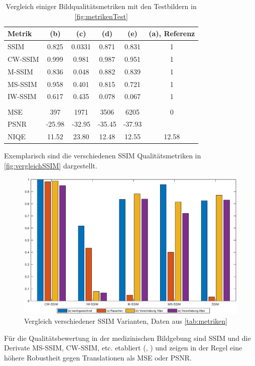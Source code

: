 \begin{table}[H]
	\centering
	\caption[Vergleich Bildqualitätsmetriken]{Vergleich einiger Bildqualitätsmetriken mit den Testbildern in \autoref{fig:metrikenTest}}
	\label{tab:metriken}
	\begin{tabular}{lSSSSS}
		\toprule
		\textbf{Metrik} & \textbf{(b)} & \textbf{(c)} & \textbf{(d)} & \textbf{(e)} & \textbf{(a), Referenz} \\
		\midrule
		SSIM    & 0.825 & 0.0331 & 0.871 & 0.831 & 1 \\
		CW-SSIM & 0.999 & 0.981  & 0.987 & 0.951 & 1 \\
		M-SSIM  & 0.836 & 0.048  & 0.882 & 0.839 & 1 \\
		MS-SSIM & 0.958 & 0.401  & 0.815 & 0.721 & 1 \\
		IW-SSIM & 0.617 & 0.435  & 0.078 & 0.067 & 1 \\
		& & & & & \\
		MSE     & 397     & 1971     & 3506    & 6205    & 0 \\
		PSNR    & -25.98  & -32.95   & -35.45  & -37.93  &  \\
		NIQE    & 11.52   & 23.80    & 12.48   & 12.55   & 12.58 \\
		\bottomrule
	\end{tabular}
\end{table}

Exemplarisch sind die verschiedenen SSIM Qualitätsmetriken in \autoref{fig:vergleichSSIM} dargestellt.

\begin{figure}[H]
	\centering
	\includegraphics[width=\textwidth]{img/metrics/ssimComp.eps}
	\caption[Vergleich verschiedener SSIM Varianten]{Vergleich verschiedener SSIM Varianten, Daten aus \autoref{tab:metriken}}
	\label{fig:vergleichSSIM}
\end{figure}

Für die Qualitätsbewertung in der medizinischen Bildgebung sind SSIM und die Derivate MS-SSIM, CW-SSIM, etc. etabliert (\cite{Punga2014}, \cite{VenkatNarayanaRao2013}) und zeigen in der Regel eine höhere Robustheit gegen Translationen als MSE oder PSNR.















